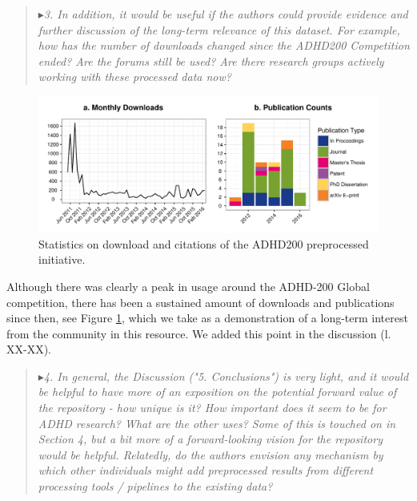 \documentclass[authoryear,3p]{elsarticle}
\begin{document}
\begin{quote}
$\blacktriangleright$\emph{3. In addition, it would be useful if the authors could provide evidence and further discussion of the long-term relevance of this dataset. For example, how has the number of downloads changed since the ADHD200 Competition ended?  Are the forums still be used?  Are there research groups actively working with these processed data now?}
\end{quote}
\begin{figure}[!t]
\begin{center}
  \includegraphics[width=\linewidth]{impact_stats}
  \caption{Statistics on download and citations of the ADHD200 preprocessed initiative.}
  \label{fig:usage}
\end{center}
\end{figure}

Although there was clearly a peak in usage around the ADHD-200 Global competition, there has been a sustained amount of downloads and publications since then, see Figure \ref{fig:usage}, which we take as a demonstration of a long-term interest from the community in this resource.  We added this point in the discussion (l. XX-XX).


\begin{quote}
$\blacktriangleright$\emph{4. In general, the Discussion ("5. Conclusions") is very light, and it would be helpful to have more of an exposition on the potential forward value of the repository - how unique is it?  How important does it seem to be for ADHD research?  What are the other uses?  Some of this is touched on in Section 4, but a bit more of a forward-looking vision for the repository would be helpful.  Relatedly, do the authors envision any mechanism by which other individuals might add preprocessed results from different processing tools / pipelines to the existing data?
}
\end{quote}
\end{document}
